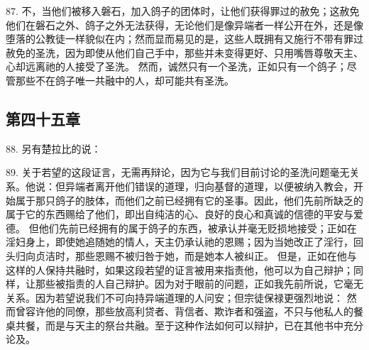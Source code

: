 87. 不，当他们被移入磐石，加入鸽子的团体时，让他们获得罪过的赦免；这赦免他们在磐石之外、鸽子之外无法获得，无论他们是像异端者一样公开在外，还是像堕落的公教徒一样貌似在内；然而显而易见的是，这些人既拥有又施行不带有罪过赦免的圣洗，因为即使从他们自己手中，那些并未变得更好、只用嘴唇尊敬天主、心却远离祂的人接受了圣洗。 然而，诚然只有一个圣洗，正如只有一个鸽子；尽管那些不在鸽子唯一共融中的人，却可能共有圣洗。\par


\subsection{第四十五章}

88. 另有楚拉比的说：\par

89. 关于若望的这段证言，无需再辩论，因为它与我们目前讨论的圣洗问题毫无关系。他说：但异端者离开他们错误的道理，归向基督的道理，以便被纳入教会，开始属于那只鸽子的肢体，而他们之前已经拥有它的圣事。因此，他们先前所缺乏的属于它的东西赐给了他们，即出自纯洁的心、良好的良心和真诚的信德的平安与爱德。 但他们先前已经拥有的属于鸽子的东西，被承认并毫无贬损地接受；正如在淫妇身上，即使她追随她的情人，天主仍承认祂的恩赐；因为当她改正了淫行，回头归向贞洁时，那些恩赐不被归咎于她，而是她本人被纠正。 但是，正如在他与这样的人保持共融时，如果这段若望的证言被用来指责他，他可以为自己辩护；同样，让那些被指责的人自己辩护。因为对于眼前的问题，正如我先前所说，它毫无关系。因为若望说我们不可向持异端道理的人问安；但宗徒保禄更强烈地说： 然而曾容许他的同僚，那些放高利贷者、背信者、欺诈者和强盗，不只与他私人的餐桌共餐，而是与天主的祭台共融。至于这种作法如何可以辩护，已在其他书中充分论及。\par


